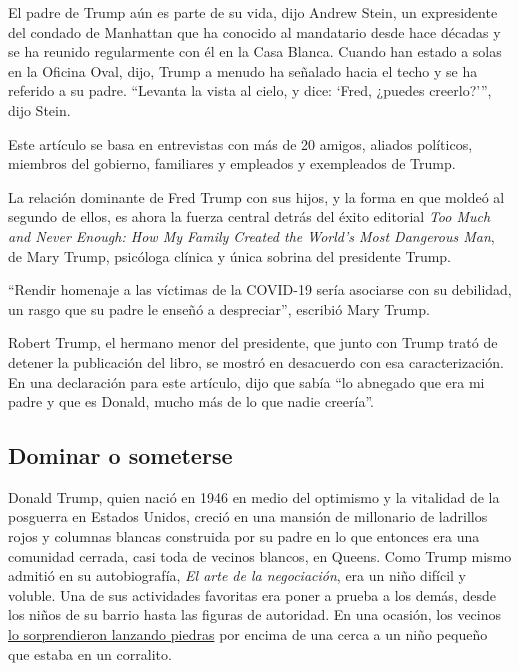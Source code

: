 El padre de Trump aún es parte de su vida, dijo Andrew Stein, un
expresidente del condado de Manhattan que ha conocido al mandatario
desde hace décadas y se ha reunido regularmente con él en la Casa
Blanca. Cuando han estado a solas en la Oficina Oval, dijo, Trump a
menudo ha señalado hacia el techo y se ha referido a su padre. ``Levanta
la vista al cielo, y dice: `Fred, ¿puedes creerlo?''', dijo Stein.

Este artículo se basa en entrevistas con más de 20 amigos, aliados
políticos, miembros del gobierno, familiares y empleados y exempleados
de Trump.

La relación dominante de Fred Trump con sus hijos, y la forma en que
moldeó al segundo de ellos, es ahora la fuerza central detrás del éxito
editorial \emph{Too Much and Never Enough: How My Family Created the
World's Most Dangerous Man}, de Mary Trump, psicóloga clínica y única
sobrina del presidente Trump.

``Rendir homenaje a las víctimas de la COVID-19 sería asociarse con su
debilidad, un rasgo que su padre le enseñó a despreciar'', escribió Mary
Trump.

Robert Trump, el hermano menor del presidente, que junto con Trump trató
de detener la publicación del libro, se mostró en desacuerdo con esa
caracterización. En una declaración para este artículo, dijo que sabía
``lo abnegado que era mi padre y que es Donald, mucho más de lo que
nadie creería''.

\hypertarget{dominar-o-someterse}{%
\subsection{Dominar o someterse}\label{dominar-o-someterse}}

Donald Trump, quien nació en 1946 en medio del optimismo y la vitalidad
de la posguerra en Estados Unidos, creció en una mansión de millonario
de ladrillos rojos y columnas blancas construida por su padre en lo que
entonces era una comunidad cerrada, casi toda de vecinos blancos, en
Queens. Como Trump mismo admitió en su autobiografía, \emph{El arte de
la negociación}, era un niño difícil y voluble. Una de sus actividades
favoritas era poner a prueba a los demás, desde los niños de su barrio
hasta las figuras de autoridad. En una ocasión, los vecinos
\href{https://www.washingtonpost.com/lifestyle/style/young-donald-trump-military-school/2016/06/22/f0b3b164-317c-11e6-8758-d58e76e11b12_story.html}{lo
sorprendieron lanzando piedras} por encima de una cerca a un niño
pequeño que estaba en un corralito.

